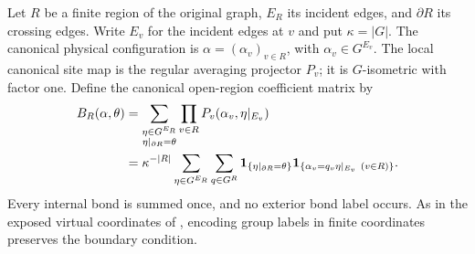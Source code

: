 \begin{definition}%
    \label{def:peps_regular_projector_open_region}
    \leanok
    Let $R$ be a finite region of the original graph, $E_R$ its incident
    edges, and $\partial R$ its crossing edges. Write $E_v$ for the
    incident edges at $v$ and put $\kappa=|G|$. The canonical physical
    configuration is $\alpha=(\alpha_v)_{v\in R}$, with
    $\alpha_v\in G^{E_v}$. The local canonical site map is the regular
    averaging projector $P_v$; it is $G$-isometric with factor one.
    Define the canonical open-region coefficient matrix by
    \begin{align}
        B_R(\alpha,\theta)
         & =\sum_{\substack{\eta\in G^{E_R}                    \\
                \eta|_{\partial R}=\theta}}
        \prod_{v\in R}P_v(\alpha_v,\eta|_{E_v})\notag          \\
         & =\kappa^{-|R|}\sum_{\eta\in G^{E_R}}\sum_{q\in G^R}
        \mathbf1_{\{\eta|_{\partial R}=\theta\}}
        \mathbf1_{\{\alpha_v=q_v\eta|_{E_v}\ (v\in R)\}}.
        \label{eq:peps_projector_region}
    \end{align}
    Every internal bond is summed once, and no exterior bond label
    occurs. As in the exposed virtual coordinates
    of \cite[Observation after Lemma~6.3]{Schuch2010PEPS}, encoding group labels in finite coordinates preserves
    the boundary condition.
\end{definition}

